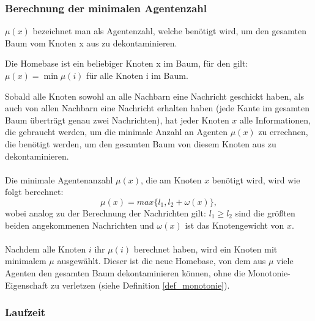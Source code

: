 
\subsubsection{Berechnung der minimalen Agentenzahl}

\begin{mydef}
	$\mu(x)$ bezeichnet man als Agentenzahl, welche benötigt wird, um den gesamten Baum vom Knoten x aus zu dekontaminieren. 
\end{mydef}

\begin{mydef}\label{def_homebase}
	Die Homebase ist ein beliebiger Knoten x im Baum, für den gilt: $\mu(x) = \min \mu(i)$ für alle Knoten i im Baum.
\end{mydef}

Sobald alle Knoten sowohl an alle Nachbarn eine Nachricht geschickt haben, als auch von allen Nachbarn eine Nachricht erhalten haben (jede Kante im gesamten Baum überträgt genau zwei Nachrichten), hat jeder Knoten $x$ alle Informationen, die gebraucht werden, um die minimale Anzahl an Agenten $\mu(x)$ zu errechnen, die benötigt werden, um den gesamten Baum von diesem Knoten aus zu dekontaminieren.
\\
\\
Die minimale Agentenanzahl $\mu(x)$, die am Knoten $x$ benötigt wird, wird wie folgt berechnet:
$$\mu(x) = max\{l_{1},  l_{2} + \omega(x)\},$$ wobei analog zu der Berechnung der Nachrichten gilt: $l_{1} \ge l_{2}$ sind die größten beiden angekommenen Nachrichten und $\omega(x)$ ist das Knotengewicht von $x$.
\\
\\
Nachdem alle Knoten $i$ ihr $\mu(i)$ berechnet haben, wird ein Knoten mit minimalem $\mu$ ausgewählt. Dieser ist die neue Homebase, von dem aus $\mu$ viele Agenten den gesamten Baum dekontaminieren können, ohne die Monotonie-Eigenschaft zu verletzen (siehe Definition \ref{def_monotonie}).


\subsubsection{Laufzeit}

